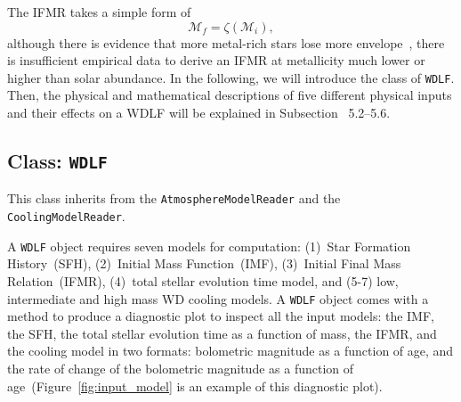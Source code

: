 \documentclass[fleqn,usenatbib]{rasti}
\begin{document}
The IFMR takes a simple form of
\begin{equation}
    \mathcal{M}_f = \zeta(\mathcal{M}_i),
\end{equation}
although there is evidence that more metal-rich stars lose more
envelope~\citep{2007ApJ...671..761K}, there is insufficient empirical data to
derive an IFMR at metallicity much lower or higher than solar abundance.
In the following, we will introduce the class of \texttt{WDLF}. Then, the
physical and mathematical descriptions of five different physical inputs and
their effects on a WDLF will be explained in Subsection \textsection~5.2--5.6.



\subsection{Class: \texttt{WDLF}}
\label{sec:wdlf}
This class inherits from the \texttt{AtmosphereModelReader} and the
\texttt{CoolingModelReader}.

A \texttt{WDLF} object requires seven models for computation: (1)~Star
Formation History~(SFH), (2)~Initial Mass Function~(IMF), (3)~Initial Final
Mass Relation~(IFMR), (4)~total stellar evolution time model, and (5-7) low,
intermediate and high mass WD cooling models.
A \texttt{WDLF} object comes with a method to produce
a diagnostic plot to inspect all the input models: the IMF, the SFH, the total
stellar evolution time as a function of mass, the IFMR, and the cooling model
in two formats: bolometric magnitude as a function of age, and the rate of
change of the bolometric magnitude as a function of
age~(Figure~\ref{fig:input_model} is an example of this diagnostic plot).
\end{document}
